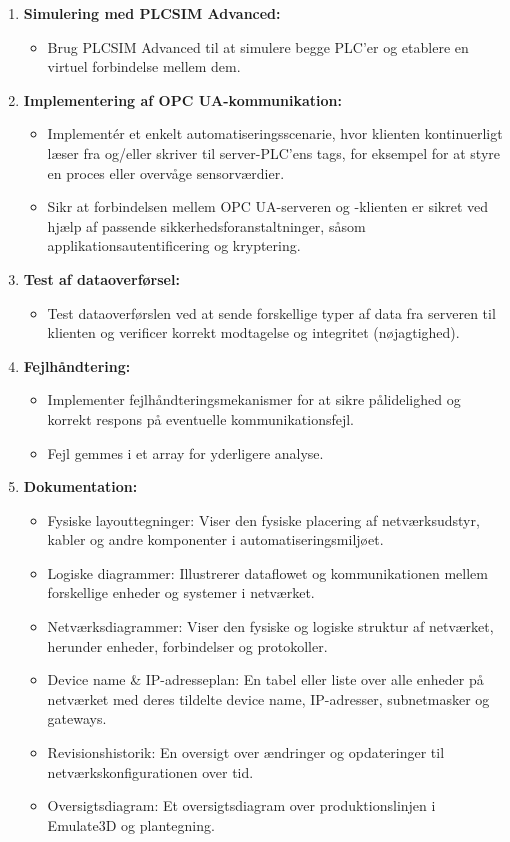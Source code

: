 \begin{enumerate}
	\item \textbf{Simulering med PLCSIM Advanced:}
	\begin{itemize}
		\item Brug PLCSIM Advanced til at simulere begge PLC'er og etablere en virtuel forbindelse mellem dem.
	\end{itemize}
	
	\item \textbf{Implementering af OPC UA-kommunikation:}
	\begin{itemize}
		\item Implementér et enkelt automatiseringsscenarie, hvor klienten kontinuerligt læser fra og/eller skriver til server-PLC'ens tags, for eksempel for at styre en proces eller overvåge sensorværdier.
		\item Sikr at forbindelsen mellem OPC UA-serveren og -klienten er sikret ved hjælp af passende sikkerhedsforanstaltninger, såsom applikationsautentificering og kryptering.
	\end{itemize}
	
	\item \textbf{Test af dataoverførsel:}
	\begin{itemize}
		\item Test dataoverførslen ved at sende forskellige typer af data fra serveren til klienten og verificer korrekt modtagelse og integritet (nøjagtighed).
	\end{itemize}
	
	\item \textbf{Fejlhåndtering:}
	\begin{itemize}
		\item Implementer fejlhåndteringsmekanismer for at sikre pålidelighed og korrekt respons på eventuelle kommunikationsfejl.
		\item Fejl gemmes i et array for yderligere analyse.
	\end{itemize}
	
	\item \textbf{Dokumentation:}
	\begin{itemize}
		\item Fysiske layouttegninger: Viser den fysiske placering af netværksudstyr, kabler og andre komponenter i automatiseringsmiljøet.
		\item Logiske diagrammer: Illustrerer dataflowet og kommunikationen mellem forskellige enheder og systemer i netværket.
		\item Netværksdiagrammer: Viser den fysiske og logiske struktur af netværket, herunder enheder, forbindelser og protokoller.
		\item Device name \& IP-adresseplan: En tabel eller liste over alle enheder på netværket med deres tildelte device name, IP-adresser, subnetmasker og gateways.
		\item Revisionshistorik: En oversigt over ændringer og opdateringer til netværkskonfigurationen over tid.
		\item Oversigtsdiagram: Et oversigtsdiagram over produktionslinjen i Emulate3D og plantegning.
	\end{itemize}
	

\end{enumerate}

